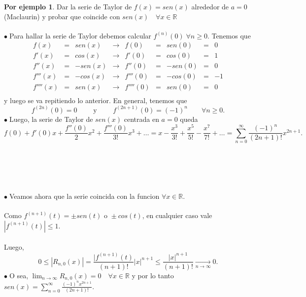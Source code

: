 \documentclass{article}
\theoremstyle{definition}
\theoremstyle{definition}
\newtheorem*{ej}{Por ejemplo}
\theoremstyle{remark}
\newcommand\bl{$\bullet\;$}
\begin{document}
\begin{ej}
  Dar la serie de Taylor de $f(x)=sen(x)$ alrededor de $a=0$ (Maclaurin) y probar que coincide con $sen(x)\quad \forall x \in \mathbb{R}$ \\\\
  \bl Para hallar la serie de Taylor debemos calcular $f^{(n)}(0) \; \forall n \geq 0$. Tenemos que \\ $$\begin{array}{rlrlrlrlr}
    f(x) & = & sen(x) & \longrightarrow & f(0) & = & sen(0) & = & 0 \\
    f'(x) & = & cos(x) & \longrightarrow & f'(0) & = & cos(0)& = & 1 \\
    f''(x) & = & -sen(x) & \longrightarrow & f''(0) & = & -sen(0)& = & 0 \\
    f'''(x) & = & -cos(x) & \longrightarrow & f'''(0) & = & -cos(0)& = & -1 \\
    f''''(x) & = & sen(x) & \longrightarrow & f''''(0) & = & sen(0)& = & 0 \\
  \end{array}$$ 
  y luego se va repitiendo lo anterior. En general, tenemos que \[ 
    f^{(2n)}(0)=0\quad \quad \text{ y } \quad \quad f^{(2n+1)}(0)=(-1)^n \quad \quad \forall n \geq 0.
    \] \bl Luego, la serie de Taylor de $sen(x)$ centrada en $a=0$ queda \[
    f(0)+f'(0)x+\frac{f''(0)}{2}x^2+\frac{f'''(0)}{3!}x^3 + \dots = x- \frac{x^3}{3!}+\frac{x^5}{5!}-\frac{x^7}{7!}+\dots=\sum_{n=0}^{\infty}{\frac{(-1)^n}{(2n+1)!}x^{2n+1}}.
  \] \\\\\\\\\\
  \bl Veamos ahora que la serie coincida con la funcion $\forall x \in \mathbb{R}$. \\\\
Como $f^{(n+1)}{(t)}=\pm sen(t) \text { o } \pm cos(t)$, en cualquier caso vale $|f^{(n+1)}{(t)}| \leq 1$. \\ \\
  Luego, \[ 
  0 \leq |R_{n,0}(x)|=\frac{|f^{(n+1)}(t)}{(n+1)!}|x|^{n+1}\leq \frac{|x|^{n+1}}{(n+1)!} \underset{n\to\infty}{\longrightarrow} 0. 
\]
\bl O sea, $\lim_{n\to\infty}{R_{n,0}(x)}=0 \quad \forall x \in \mathbb{R}$ y por lo tanto $sen(x)=\sum_{n=0}^{\infty}{\frac{(-1)^{n}x^{2n+1}}{(2n+1)!}}$. 
\end{ej}
\end{document}
